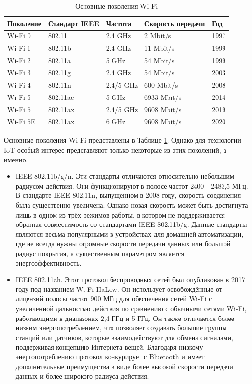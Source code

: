 	\begin{table}[h]
		\centering
		\begin{tabular}{ | l | l | l | l | l | }
			\hline
			Поколение & Стандарт IEEE & Частота & Скорость передачи & Год \\ \hline
			Wi-Fi 0 & 802.11 & 2.4 GHz & 2 Mbit/s & 1997 \\ \hline
			Wi-Fi 1 & 802.11b & 2.4 GHz & 11 Mbit/s & 1999 \\ \hline
			Wi-Fi 2 & 802.11a & 5 GHz & 54 Mbit/s & 1999 \\ \hline
			Wi-Fi 3 & 802.11g & 2.4 GHz & 54 Mbit/s & 2003 \\ \hline
			Wi-Fi 4 & 802.11n & 2.4/5 GHz & 600 Mbit/s & 2008 \\ \hline
			Wi-Fi 5 & 802.11ac & 5 GHz & 6933 Mbit/s & 2014 \\ \hline
			Wi-Fi 6 & 802.11ax & 2.4/5 GHz & 9608 Mbit/s & 2019 \\ \hline
			Wi-Fi 6E & 802.11ax & 6 GHz & 9608 Mbit/s & 2020 \\
			\hline
		\end{tabular}
		\caption{Основные поколения Wi-Fi}
		\label{table 1}
	\end{table}
	
	Основные поколения Wi-Fi представлены в Таблице \ref{table 1}. Однако для технологии IoT особый интерес 
	представляют только некоторые из этих поколений, а именно:
	
	\begin{itemize}
		\item IEEE 802.11b/g/n. Эти стандарты отличаются относительно небольшим радиусом действия.
		Они функционируют в полосе частот 2400—2483,5 МГц. В стандарте  IEEE 802.11n, выпущенном
		в 2008 году, скорость соединения была существенно увеличена. Однако новая скорость может
		быть достигнута лишь в одном из трёх режимов работы, в котором не поддерживается обратная
		совместимость со стандартами IEEE 802.11b/g. Данные стандарты являются весьма популярными
		в устройствах для домашней автоматизации, где не всегда нужны огромные скорости передачи
		данных или большой радиус покрытия, а существенным параметром является энергоэффективность.
		\item IEEE 802.11ah. Этот протокол беспроводных сетей был опубликован в 2017 году под названием 
		Wi-Fi HaLow. Он использует освобождённые от лицензий полосы частот 900 МГц для обеспечения 
		сетей Wi-Fi с увеличенной дальностью действия по сравнению с обычными сетями Wi-Fi, работающими 
		в диапазонах 2,4 ГГц и 5 ГГц. Он также отличается более низким энергопотреблением, что позволяет 
		создавать большие группы станций или датчиков, которые взаимодействуют для обмена сигналами, 
		поддерживая концепцию Интернета вещей. Благодаря низкому энергопотреблению протокол конкурирует 
		с Bluetooth и имеет дополнительные преимущества в виде более высокой скорости передачи данных 
		и более широкого радиуса действия.
	\end{itemize}
	
